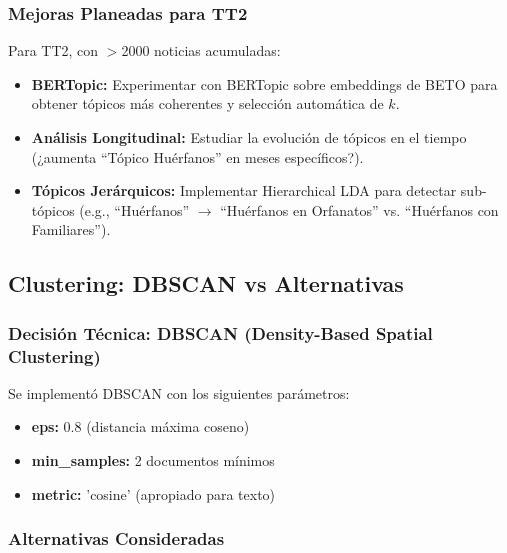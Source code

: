 \subsubsection{Mejoras Planeadas para TT2}
\label{subsubsec:mejoras_topicos_tt2}

Para TT2, con $>$2000 noticias acumuladas:

\begin{itemize}
    \item \textbf{BERTopic:} Experimentar con BERTopic sobre embeddings de BETO para obtener tópicos más coherentes y selección automática de $k$.
    \item \textbf{Análisis Longitudinal:} Estudiar la evolución de tópicos en el tiempo (¿aumenta ``Tópico Huérfanos'' en meses específicos?).
    \item \textbf{Tópicos Jerárquicos:} Implementar Hierarchical LDA para detectar sub-tópicos (e.g., ``Huérfanos'' $\rightarrow$ ``Huérfanos en Orfanatos'' vs. ``Huérfanos con Familiares'').
\end{itemize}

\subsection{Clustering: DBSCAN vs Alternativas}
\label{subsec:clustering}

\subsubsection{Decisión Técnica: DBSCAN (Density-Based Spatial Clustering)}
\label{subsubsec:dbscan_decision}

Se implementó DBSCAN con los siguientes parámetros:
\begin{itemize}
    \item \textbf{eps:} 0.8 (distancia máxima coseno)
    \item \textbf{min\_samples:} 2 documentos mínimos
    \item \textbf{metric:} 'cosine' (apropiado para texto)
\end{itemize}

\subsubsection{Alternativas Consideradas}
\label{subsubsec:alternativas_clustering}

